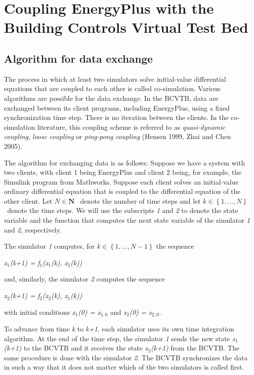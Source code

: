 \section{Coupling EnergyPlus with the Building Controls Virtual Test Bed}\label{coupling-energyplus-with-the-building-controls-virtual-test-bed}

\subsection{Algorithm for data exchange}\label{algorithm-for-data-exchange}

The process in which at least two simulators solve initial-value differential equations that are coupled to each other is called co-simulation. Various algorithms are possible for the data exchange. In the BCVTB, data are exchanged between its client programs, including EnergyPlus, using a fixed synchronization time step. There is no iteration between the clients. In the co-simulation literature, this coupling scheme is referred to as \emph{quasi-dynamic coupling}, \emph{loose coupling} or \emph{ping-pong coupling} (Hensen 1999, Zhai and Chen 2005).

The algorithm for exchanging data is as follows: Suppose we have a system with two clients, with client 1 being EnergyPlus and client 2 being, for example, the Simulink program from Mathworks. Suppose each client solves an initial-value ordinary differential equation that is coupled to the differential equation of the other client. Let \(N\in\mathbf{N}\) ~denote the number of time steps and let \(k\in\left\{1,...,N\right\}\) ~denote the time steps. We will use the subscripts \emph{1} and \emph{2} to denote the state variable and the function that computes the next state variable of the simulator \emph{1} and \emph{2}, respectively.

The simulator \emph{1} computes, for \(k\in\left\{1,...,N-1\right\}\) the sequence

\emph{x\(_{1}\)(k+1) = f\(_{1}\)(x\(_{1}\)(k), x\(_{2}\)(k))}

and, similarly, the simulator \emph{2} computes the sequence

\emph{x\(_{2}\)(k+1) = f\(_{2}\)(x\(_{2}\)(k), x\(_{1}\)(k))}

with initial conditions \emph{x\(_{1}\)(0) = x\(_{1,0}\)} and \emph{x\(_{2}\)(0) = x\(_{2,0}\)}.

To advance from time \emph{k} to \emph{k+1}, each simulator uses its own time integration algorithm. At the end of the time step, the simulator \emph{1} sends the new state \emph{x\(_{1}\)(k+1)} to the BCVTB and it receives the state \emph{x\(_{2}\)(k+1)} from the BCVTB. The same procedure is done with the simulator \emph{2}. The BCVTB synchronizes the data in such a way that it does not matter which of the two simulators is called first.

